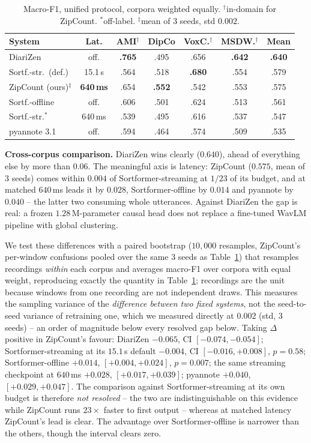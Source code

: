 \documentclass[10pt,conference]{IEEEtran}
\newcommand{\best}[1]{\textbf{#1}}
\newcommand{\sys}{ZipCount}
\begin{document}
\begin{table}[t]
\centering
\caption{Macro-F1, unified protocol, corpora weighted equally.
$^{\dagger}$in-domain for \sys{}. $^{*}$off-label. $^{\ddagger}$mean of 3
seeds, std $0.002$.}
\label{tab:main}
\footnotesize
\setlength{\tabcolsep}{2.6pt}
\begin{tabular}{lccccc c}
\toprule
System & Lat. & AMI$^{\dagger}$ & DipCo & VoxC.$^{\dagger}$ & MSDW.$^{\dagger}$ & Mean \\
\midrule
DiariZen              & off.       & \best{.765} & .495 & .656 & \best{.642} & \best{.640} \\
Sortf.-str.\ (def.)   & 15.1\,s    & .564 & .518 & \best{.680} & .554 & .579 \\
\sys{} (ours)$^{\ddagger}$ & \best{640\,ms} & .654 & \best{.552} & .542 & .553 & .575 \\
Sortf.-offline        & off.       & .606 & .501 & .624 & .513 & .561 \\
Sortf.-str.$^{*}$     & 640\,ms    & .539 & .495 & .616 & .537 & .547 \\
pyannote 3.1          & off.       & .594 & .464 & .574 & .509 & .535 \\
\bottomrule
\end{tabular}
\end{table}

\textbf{Cross-corpus comparison.} DiariZen wins clearly ($0.640$), ahead of
everything else by more than $0.06$. The meaningful axis is latency:
\sys{} ($0.575$, mean of 3 seeds) comes within $0.004$ of
Sortformer-streaming at $1/23$ of its budget, and at matched $640$\,ms
leads it by $0.028$, Sortformer-offline by $0.014$ and pyannote by $0.040$
-- the latter two consuming whole utterances. Against DiariZen the gap is
real: a frozen $1.28$\,M-parameter causal head does not replace a
fine-tuned WavLM pipeline with global clustering.

We test these differences with a paired bootstrap ($10{,}000$ resamples,
\sys{}'s per-window confusions pooled over the same 3 seeds as
Table~\ref{tab:main}) that resamples recordings \emph{within} each corpus
and averages macro-F1 over corpora with equal weight, reproducing exactly
the quantity in Table~\ref{tab:main}; recordings are the unit because
windows from one recording are not independent draws. This measures the
sampling variance of the \emph{difference between two fixed systems}, not
the seed-to-seed variance of retraining one, which we measured directly at
$0.002$ (std, 3 seeds) -- an order of magnitude below every resolved gap
below. Taking $\Delta$ positive in \sys{}'s favour: DiariZen $-0.065$, CI
$[-0.074,-0.054]$; Sortformer-streaming at its $15.1$\,s default $-0.004$,
CI $[-0.016,+0.008]$, $p\!=\!0.58$; Sortformer-offline $+0.014$,
$[+0.004,+0.024]$, $p\!=\!0.007$; the same streaming checkpoint at
$640$\,ms $+0.028$, $[+0.017,+0.039]$; pyannote $+0.040$,
$[+0.029,+0.047]$. The comparison against Sortformer-streaming at its own
budget is therefore \emph{not resolved} -- the two are indistinguishable on
this evidence while \sys{} runs $23\times$ faster to first output -- whereas
at matched latency \sys{}'s lead is clear. The advantage over
Sortformer-offline is narrower than the others, though the interval clears
zero.
\end{document}
